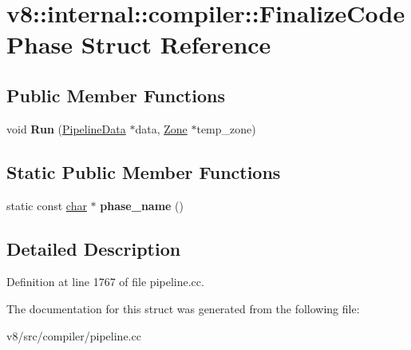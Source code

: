 \hypertarget{structv8_1_1internal_1_1compiler_1_1FinalizeCodePhase}{}\section{v8\+:\+:internal\+:\+:compiler\+:\+:Finalize\+Code\+Phase Struct Reference}
\label{structv8_1_1internal_1_1compiler_1_1FinalizeCodePhase}
\subsection*{Public Member Functions}
\begin{DoxyCompactItemize}
\item 
\mbox{\label{structv8_1_1internal_1_1compiler_1_1FinalizeCodePhase_a6aec671ddd532874c4ce9b7b682ca214}} 
void {\bfseries Run} (\mbox{\hyperlink{classv8_1_1internal_1_1compiler_1_1PipelineData}{Pipeline\+Data}} $\ast$data, \mbox{\hyperlink{classv8_1_1internal_1_1Zone}{Zone}} $\ast$temp\+\_\+zone)
\end{DoxyCompactItemize}
\subsection*{Static Public Member Functions}
\begin{DoxyCompactItemize}
\item 
\mbox{\label{structv8_1_1internal_1_1compiler_1_1FinalizeCodePhase_ac4333eb7f1f9c63ab401554fe75ede98}} 
static const \mbox{\hyperlink{classchar}{char}} $\ast$ {\bfseries phase\+\_\+name} ()
\end{DoxyCompactItemize}


\subsection{Detailed Description}


Definition at line 1767 of file pipeline.\+cc.



The documentation for this struct was generated from the following file\+:\begin{DoxyCompactItemize}
\item 
v8/src/compiler/pipeline.\+cc\end{DoxyCompactItemize}
